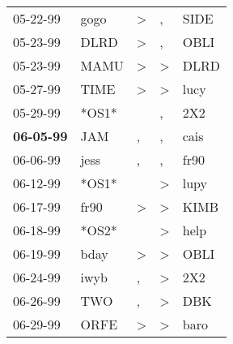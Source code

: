 \begin{supertabular}{p{0.07\textwidth}p{0.06\textwidth}p{0.02\textwidth}p{0.02\textwidth}p{0.06\textwidth}}
          05-22-99\textsuperscript{} &           gogo\textsuperscript{} &     \textgreater &                , &           SIDE\textsuperscript{} \\
          05-23-99\textsuperscript{} &           DLRD\textsuperscript{} &     \textgreater &                , &           OBLI\textsuperscript{} \\
          05-23-99\textsuperscript{} &           MAMU\textsuperscript{} &     \textgreater &     \textgreater &           DLRD\textsuperscript{} \\
          05-27-99\textsuperscript{} &           TIME\textsuperscript{} &     \textgreater &     \textgreater &           lucy\textsuperscript{} \\
          05-29-99\textsuperscript{} &                            *OS1* &                  &                , &            2X2\textsuperscript{} \\
 \textbf{06-05-99\textsuperscript{}} &            JAM\textsuperscript{} &                , &                , &           cais\textsuperscript{} \\
          06-06-99\textsuperscript{} &           jess\textsuperscript{} &                , &                , &           fr90\textsuperscript{} \\
          06-12-99\textsuperscript{} &                            *OS1* &                  &     \textgreater &           lupy\textsuperscript{} \\
          06-17-99\textsuperscript{} &           fr90\textsuperscript{} &     \textgreater &     \textgreater &           KIMB\textsuperscript{} \\
          06-18-99\textsuperscript{} &                            *OS2* &                  &     \textgreater &           help\textsuperscript{} \\
          06-19-99\textsuperscript{} &           bday\textsuperscript{} &     \textgreater &     \textgreater &           OBLI\textsuperscript{} \\
          06-24-99\textsuperscript{} &           iwyb\textsuperscript{} &                , &     \textgreater &            2X2\textsuperscript{} \\
          06-26-99\textsuperscript{} &            TWO\textsuperscript{} &                , &     \textgreater &            DBK\textsuperscript{} \\
          06-29-99\textsuperscript{} &           ORFE\textsuperscript{} &     \textgreater &     \textgreater &           baro\textsuperscript{} \\

\end{supertabular}
